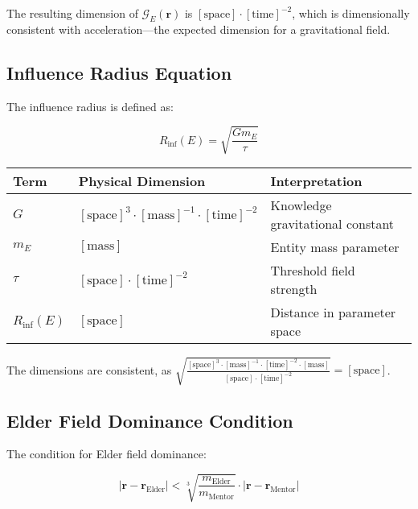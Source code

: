 The resulting dimension of $\mathcal{G}_E(\mathbf{r})$ is $[\text{space}] \cdot [\text{time}]^{-2}$, which is dimensionally consistent with acceleration—the expected dimension for a gravitational field.

\subsection{Influence Radius Equation}

The influence radius is defined as:

\begin{equation}
R_{\text{inf}}(E) = \sqrt{\frac{G m_E}{\tau}}
\end{equation}

\begin{center}
\label{tab:dimensional_analysis_influence_radius}
\begin{tabular}{p{3cm} p{5cm} p{6cm}}
\textbf{Term} & \textbf{Physical Dimension} & \textbf{Interpretation} \\
\hline
$G$ & $[\text{space}]^3 \cdot [\text{mass}]^{-1} \cdot [\text{time}]^{-2}$ & Knowledge gravitational constant \\
$m_E$ & $[\text{mass}]$ & Entity mass parameter \\
$\tau$ & $[\text{space}] \cdot [\text{time}]^{-2}$ & Threshold field strength \\
\hline
$R_{\text{inf}}(E)$ & $[\text{space}]$ & Distance in parameter space \\
\hline
\end{tabular}
\end{center}

The dimensions are consistent, as $\sqrt{\frac{[\text{space}]^3 \cdot [\text{mass}]^{-1} \cdot [\text{time}]^{-2} \cdot [\text{mass}]}{[\text{space}] \cdot [\text{time}]^{-2}}} = [\text{space}]$.

\subsection{Elder Field Dominance Condition}

The condition for Elder field dominance:

\begin{equation}
|\mathbf{r} - \mathbf{r}_{\text{Elder}}| < \sqrt[3]{\frac{m_{\text{Elder}}}{m_{\text{Mentor}}}} \cdot |\mathbf{r} - \mathbf{r}_{\text{Mentor}}|
\end{equation}

